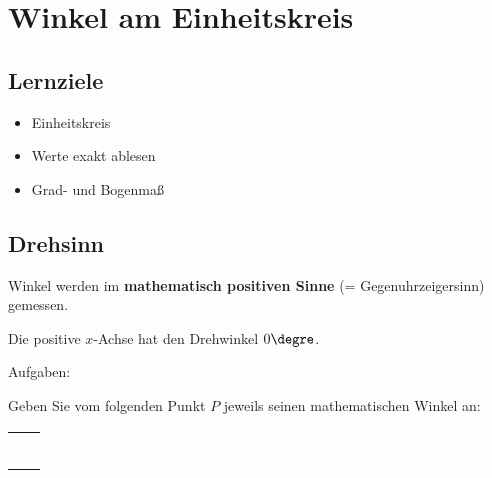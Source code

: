 
\section{Winkel am Einheitskreis}


\subsection*{Lernziele}

\begin{itemize}
\item Einheitskreis
\item Werte exakt ablesen
\item Grad- und Bogenmaß
\end{itemize}

\newpage
\subsection{Drehsinn}
Winkel werden im \textbf{mathematisch positiven Sinne} (=
Gegenuhrzeigersinn) gemessen.

Die positive $x$-Achse hat den Drehwinkel $0\degre$.

Aufgaben:

Geben Sie vom folgenden Punkt $P$ jeweils seinen mathematischen
Winkel an:


\begin{tabular}{cc}\makecell{
  $P=(1 | 1)\TRAINER{=45\degre}$\\
  \miniEinheitskreis{}} &

  \makecell{$P=(-1 | 1)\TRAINER{=135\degre}$\\
  \miniEinheitskreis{}} \\


   \makecell{ $P=(1 | -1)\TRAINER{=315\degre = -45\degre}$\\
  \miniEinheitskreis{}} &

  \makecell{$P=(\sqrt{3} | -1)\TRAINER{330\degre = -30\degre}$\\
  \miniEinheitskreis{}} \\

\end{tabular}

\newpage


